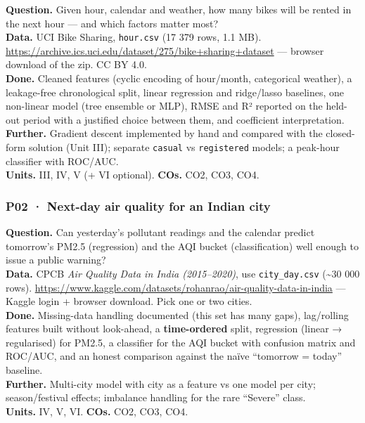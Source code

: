 \documentclass[11pt]{article}
\begin{document}
\textbf{Question.} Given hour, calendar and weather, how many bikes will be rented in the next hour --- and which factors matter most?\\
\textbf{Data.} UCI Bike Sharing, \texttt{hour.csv} (17 379 rows, 1.1 MB). \url{https://archive.ics.uci.edu/dataset/275/bike+sharing+dataset} --- browser download of the zip. CC BY 4.0.\\
\textbf{Done.} Cleaned features (cyclic encoding of hour/month, categorical weather), a leakage-free chronological split, linear regression and ridge/lasso baselines, one non-linear model (tree ensemble or MLP), RMSE and R² reported on the held-out period with a justified choice between them, and coefficient interpretation.\\
\textbf{Further.} Gradient descent implemented by hand and compared with the closed-form solution (Unit III); separate \texttt{casual} vs \texttt{registered} models; a peak-hour classifier with ROC/AUC.\\
\textbf{Units.} III, IV, V (+ VI optional). \textbf{COs.} CO2, CO3, CO4.

\hypertarget{p02-next-day-air-quality-for-an-indian-city}{%
\subsubsection{P02 · Next-day air quality for an Indian city}\label{p02-next-day-air-quality-for-an-indian-city}}

\textbf{Question.} Can yesterday's pollutant readings and the calendar predict tomorrow's PM2.5 (regression) and the AQI bucket (classification) well enough to issue a public warning?\\
\textbf{Data.} CPCB \emph{Air Quality Data in India (2015--2020)}, use \texttt{city\_day.csv} (\textasciitilde30 000 rows). \url{https://www.kaggle.com/datasets/rohanrao/air-quality-data-in-india} --- Kaggle login + browser download. Pick one or two cities.\\
\textbf{Done.} Missing-data handling documented (this set has many gaps), lag/rolling features built without look-ahead, a \textbf{time-ordered} split, regression (linear → regularised) for PM2.5, a classifier for the AQI bucket with confusion matrix and ROC/AUC, and an honest comparison against the naïve ``tomorrow = today'' baseline.\\
\textbf{Further.} Multi-city model with city as a feature vs one model per city; season/festival effects; imbalance handling for the rare ``Severe'' class.\\
\textbf{Units.} IV, V, VI. \textbf{COs.} CO2, CO3, CO4.
\end{document}
